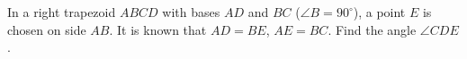 In a right trapezoid $ABCD$ with bases $AD$ and $BC$ ($\angle B=90^{\circ}$), a point $E$ is chosen on side $AB$. It is known that $AD=BE$, $AE=BC$. Find the angle $\angle CDE$.
